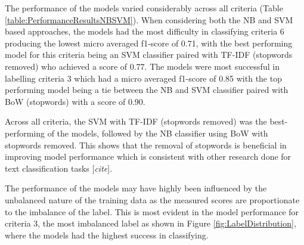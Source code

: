\documentclass[a4paper,twoside,phd]{BYUPhys}
\begin{document}
The performance of the models varied considerably across all criteria (Table \ref{table:PerformanceResultsNBSVM}). When considering both the NB and SVM based approaches, the models had the most difficulty in classifying criteria 6 producing the lowest micro averaged f1-score of 0.71, with the best performing model for this criteria being an SVM classifier paired with TF-IDF (stopwords removed) who achieved a score of 0.77. The models were most successful in labelling criteria 3 which had a micro averaged f1-score of 0.85 with the top performing model being a tie between the NB and SVM classifier paired with BoW (stopwords) with a score of 0.90. \newline

Across all criteria, the SVM with TF-IDF (stopwords removed) was the best-performing of the models, followed by the NB classifier using BoW with stopwords removed. This shows that the removal of stopwords is beneficial in improving model performance which is consistent with other research done for text classification tasks [\textit{cite}]. \newline

The performance of the models may have highly been influenced by the unbalanced nature of the training data as the measured scores are proportionate to the imbalance of the label. This is most evident in the model performance for criteria 3, the most imbalanced label as shown in Figure \ref{fig:LabelDistribution}, where the models had the highest success in classifying. \newline
\end{document}
